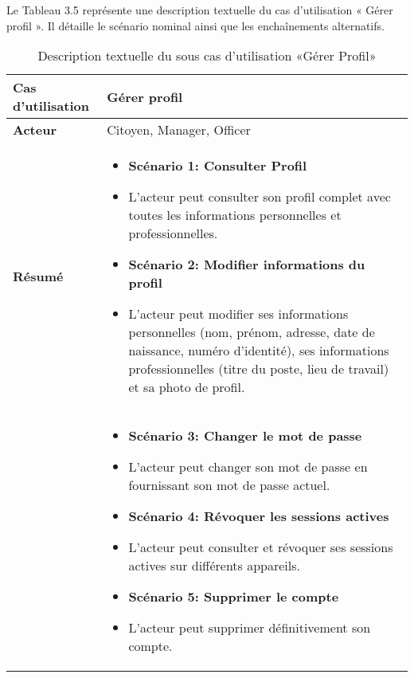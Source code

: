 Le Tableau 3.5 représente une description textuelle du cas d'utilisation « Gérer profil ». Il détaille le scénario nominal ainsi que les enchaînements alternatifs.
\begin{longtable}{|>{\arraybackslash}p{4.2cm}|>{\arraybackslash}p{12.5cm}|}
\caption{\centering Description textuelle du sous cas d'utilisation «Gérer Profil»}
\label{tab:backlog:ch2:5} \\
\hline
\rowcolor{gray!30}
\textbf{Cas d'utilisation} & Gérer profil \\
\hline
\endfirsthead

\hline
\endhead

\hline
\endfoot

\hline \hline
\endlastfoot

\textbf{Acteur}  & Citoyen, Manager, Officer \\
\hline
\textbf{Résumé} &
\begin{itemize}[label=]
  \item\textbf{Scénario 1: Consulter Profil}
  \item L'acteur peut consulter son profil complet avec toutes les informations personnelles et professionnelles.
  \item\textbf{Scénario 2: Modifier informations du profil}
  \item L'acteur peut modifier ses informations personnelles (nom, prénom, adresse, date de naissance, numéro d'identité), ses informations professionnelles (titre du poste, lieu de travail) et sa photo de profil.

\end{itemize}\\

 \hline
 \textbf{}&
\begin{itemize}[label=]
  \item\textbf{Scénario 3: Changer le mot de passe}
  \item L'acteur peut changer son mot de passe en fournissant son mot de passe actuel.
  \item\textbf{Scénario 4: Révoquer les sessions actives}
  \item L'acteur peut consulter et révoquer ses sessions actives sur différents appareils.
   \item\textbf{Scénario 5: Supprimer le compte}
  \item L'acteur peut supprimer définitivement son compte.

\end{itemize}\\


\end{longtable}
